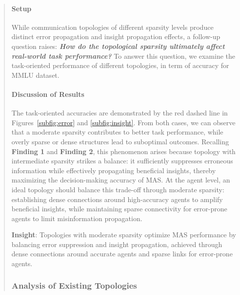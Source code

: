 \documentclass[11pt]{article}
\begin{document}
\begin{abstract}
\paragraph{Setup} 
While communication topologies of different sparsity levels produce distinct error propagation and insight propagation effects, a follow-up question raises: \textbf{\textit{How do the topological sparsity ultimately affect real-world task performance?}} To answer this question, we examine the task-oriented performance of different topologies, in term of accuracy for MMLU dataset.

\paragraph{Discussion of Results} 
The task-oriented accuracies are demonstrated by the red dashed line in Figures~\ref{subfig:error} and \ref{subfig:insight}. From both cases, we can observe that a moderate sparsity contributes to better task performance, while overly sparse or dense structures lead to suboptimal outcomes. Recalling \textbf{\textcolor{deepgreen}{Finding 1}} and \textbf{\textcolor{deepgreen}{Finding 2}}, this phenomenon arises because topology with intermediate sparsity strikes a balance: it sufficiently suppresses erroneous information while effectively propagating beneficial insights, thereby maximizing the decision-making accuracy of MAS. At the agent level, an ideal topology should balance this trade-off through moderate sparsity: establishing dense connections around high-accuracy agents to amplify beneficial insights, while maintaining sparse connectivity for error-prone agents to limit misinformation propagation.

\begin{tcolorbox}[
    enhanced, %
    colback=white, %
    colframe=deepblue, %
    boxrule=1pt, %
    arc=5pt, %
    left=5pt, right=5pt, %
    top=5pt, bottom=5pt, %
    width=\linewidth %
]
\textbf{\textcolor{deepblue}{Insight}}: Topologies with moderate sparsity optimize MAS performance by balancing error suppression and insight propagation, achieved through dense connections around accurate agents and sparse links for error-prone agents.
\end{tcolorbox}

\subsubsection{Analysis of Existing Topologies}

\end{abstract}
\end{document}
